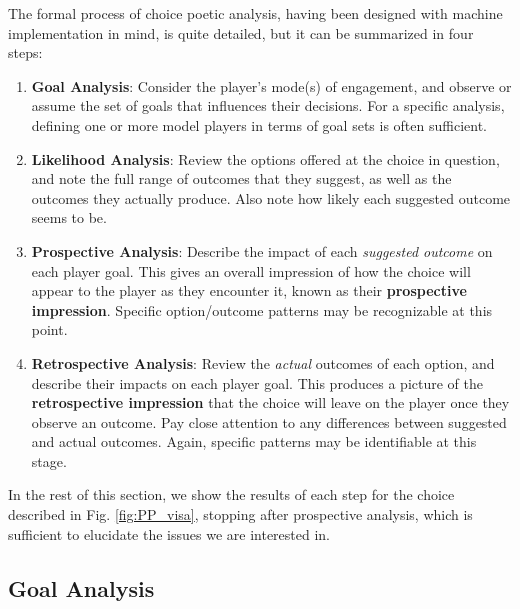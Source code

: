 \documentclass[arts,article,submit,moreauthors,pdftex,10pt,a4paper]{Definitions/mdpi}
\begin{document}
The formal process of choice poetic analysis, having been designed with machine implementation in mind, is quite detailed, but it can be summarized in four steps:
\begin{enumerate}
  \item \textbf{Goal Analysis}: Consider the player's mode(s) of engagement, and observe or assume the set of goals that influences their decisions. For a specific analysis, defining one or more model players in terms of goal sets is often sufficient.
  \item \textbf{Likelihood Analysis}: Review the options offered at the choice in question, and note the full range of outcomes that they suggest, as well as the outcomes they actually produce. Also note how likely each suggested outcome seems to be.
  \item \textbf{Prospective Analysis}: Describe the impact of each \emph{suggested outcome} on each player goal. This gives an overall impression of how the choice will appear to the player as they encounter it, known as their \textbf{prospective impression}. Specific option/outcome patterns may be recognizable at this point.
  \item \textbf{Retrospective Analysis}: Review the \emph{actual} outcomes of each option, and describe their impacts on each player goal. This produces a picture of the \textbf{retrospective impression} that the choice will leave on the player once they observe an outcome. Pay close attention to any differences between suggested and actual outcomes. Again, specific patterns may be identifiable at this stage.
\end{enumerate}
In the rest of this section, we show the results of each step for the choice described in Fig. \ref{fig:PP_visa}, stopping after prospective analysis, which is sufficient to elucidate the issues we are interested in.


\subsection{Goal Analysis}
\end{document}
